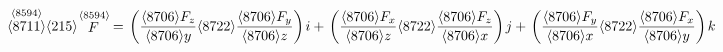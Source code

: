

    \[\let\par\empty

    
{
{\mathop{{
\unicode{8711}
}}\limits\sp{{
\unicode{8594}
}}}
\unicode{215}
{\mathop{{
F
}}\limits\sp{{
\unicode{8594}
}}}
=
{\left.
\middle(
{\frac{{
\unicode{8706}
{{{
F
}}\sb{{
z
}}}
}}{{
\unicode{8706}
y
}}}
\unicode{8722}
{\frac{{
\unicode{8706}
{{{
F
}}\sb{{
y
}}}
}}{{
\unicode{8706}
z
}}}
\middle)
\right.}
{
{
i
}
}
+
{\left.
\middle(
{\frac{{
\unicode{8706}
{{{
F
}}\sb{{
x
}}}
}}{{
\unicode{8706}
z
}}}
\unicode{8722}
{\frac{{
\unicode{8706}
{{{
F
}}\sb{{
z
}}}
}}{{
\unicode{8706}
x
}}}
\middle)
\right.}
{
{
j
}
}
+
{\left.
\middle(
{\frac{{
\unicode{8706}
{{{
F
}}\sb{{
y
}}}
}}{{
\unicode{8706}
x
}}}
\unicode{8722}
{\frac{{
\unicode{8706}
{{{
F
}}\sb{{
x
}}}
}}{{
\unicode{8706}
y
}}}
\middle)
\right.}
{
{
k
}
}
}


    \]

  